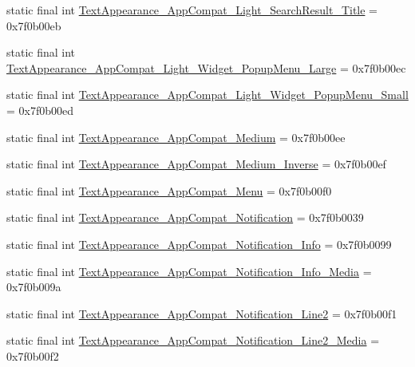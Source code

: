\begin{CompactItemize}
\item 
static final int \hyperlink{classandroid_1_1support_1_1v7_1_1palette_1_1_r_1_1style_a0681d32639f772f173fd2f49bef0cee}{TextAppearance\_\-AppCompat\_\-Light\_\-SearchResult\_\-Title} = 0x7f0b00eb
\item 
static final int \hyperlink{classandroid_1_1support_1_1v7_1_1palette_1_1_r_1_1style_0244816d6d15e586af0ea3b2940d8806}{TextAppearance\_\-AppCompat\_\-Light\_\-Widget\_\-PopupMenu\_\-Large} = 0x7f0b00ec
\item 
static final int \hyperlink{classandroid_1_1support_1_1v7_1_1palette_1_1_r_1_1style_9f5c60f8f25dba31fa62f529b5b0db2d}{TextAppearance\_\-AppCompat\_\-Light\_\-Widget\_\-PopupMenu\_\-Small} = 0x7f0b00ed
\item 
static final int \hyperlink{classandroid_1_1support_1_1v7_1_1palette_1_1_r_1_1style_5ed0df6323c8114976153b14880ae508}{TextAppearance\_\-AppCompat\_\-Medium} = 0x7f0b00ee
\item 
static final int \hyperlink{classandroid_1_1support_1_1v7_1_1palette_1_1_r_1_1style_f000bfb28796fd08f0165e63f138f796}{TextAppearance\_\-AppCompat\_\-Medium\_\-Inverse} = 0x7f0b00ef
\item 
static final int \hyperlink{classandroid_1_1support_1_1v7_1_1palette_1_1_r_1_1style_53aed2572b2cae42320a7788135a7072}{TextAppearance\_\-AppCompat\_\-Menu} = 0x7f0b00f0
\item 
static final int \hyperlink{classandroid_1_1support_1_1v7_1_1palette_1_1_r_1_1style_9bb0d8d11d137176de57419a69cf32a8}{TextAppearance\_\-AppCompat\_\-Notification} = 0x7f0b0039
\item 
static final int \hyperlink{classandroid_1_1support_1_1v7_1_1palette_1_1_r_1_1style_1b27b82a19b93bbf49acc9da8f3686b0}{TextAppearance\_\-AppCompat\_\-Notification\_\-Info} = 0x7f0b0099
\item 
static final int \hyperlink{classandroid_1_1support_1_1v7_1_1palette_1_1_r_1_1style_5476a7871637d214c797cf19c013561e}{TextAppearance\_\-AppCompat\_\-Notification\_\-Info\_\-Media} = 0x7f0b009a
\item 
static final int \hyperlink{classandroid_1_1support_1_1v7_1_1palette_1_1_r_1_1style_8276086a43ad692ce6d94d3abf34513e}{TextAppearance\_\-AppCompat\_\-Notification\_\-Line2} = 0x7f0b00f1
\item 
static final int \hyperlink{classandroid_1_1support_1_1v7_1_1palette_1_1_r_1_1style_02b25a072f95878d0966e1e076b09332}{TextAppearance\_\-AppCompat\_\-Notification\_\-Line2\_\-Media} = 0x7f0b00f2
\item 

\end{CompactItemize}
